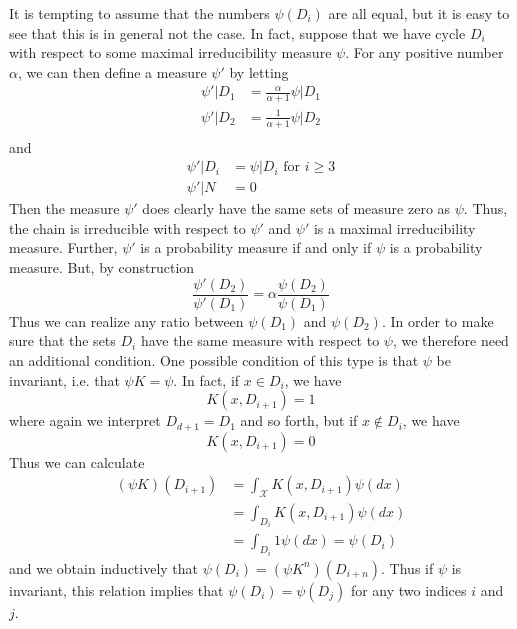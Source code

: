 \documentclass[a4paper, draft]{article}
\theoremstyle{own}
\theoremstyle{remark}
\begin{document}
It is tempting to assume that the numbers $\psi(D_i)$ are all equal, but it is easy to see that this is in general not the case. In fact, suppose that we have cycle $D_i$ with respect to some maximal irreducibility measure $\psi$. For any positive number $\alpha$, we can then define a measure
$\psi'$ by letting
\begin{align*}
\psi' | D_1 &= \frac{\alpha}{\alpha +1 } \psi | D_1 \\
\psi' | D_2 &= \frac{1}{\alpha +1 } \psi | D_2 \\
\end{align*}
and
\begin{align*}
\psi' | D_i &= \psi | D_i \, \, \text{for} \, \,  i \geq 3 \\
\psi' | N &= 0
\end{align*}
Then the measure $\psi'$ does clearly have the same sets of measure zero as $\psi$. Thus, the chain is irreducible with respect to $\psi'$ and $\psi'$ is a maximal irreducibility measure. Further, $\psi'$ is a probability measure if and only if $\psi$ is a probability measure. But, by construction
$$
\frac{\psi'(D_2)}{\psi'(D_1)} = \alpha \frac{\psi(D_2)}{\psi(D_1)}
$$
Thus we can realize any ratio between $\psi(D_1)$ and $\psi(D_2)$. In order to make sure that the sets $D_i$ have the same measure with respect to $\psi$, we therefore need an additional condition. One possible condition of this type is that $\psi$ be invariant, i.e. that $\psi K = \psi$. In fact, if 
$x \in D_i$, we have
$$
K(x, D_{i+1}) = 1
$$
where again we interpret $D_{d+1} = D_1$ and so forth, but if $x \notin D_i$, we have
$$
K(x,D_{i+1}) = 0
$$
Thus we can calculate
\begin{align*}
(\psi K)(D_{i+1}) &= \int_{\mathcal X} K(x,D_{i+1}) \psi(dx) \\
&= \int_{D_i} K(x,D_{i+1}) \psi(dx) \\
&= \int_{D_i} 1 \psi(dx) = \psi(D_i)
\end{align*}
and we obtain inductively that $\psi(D_i) = (\psi K^n)(D_{i+n})$. 
Thus if $\psi$ is invariant, this relation implies that $\psi(D_i) = \psi(D_j)$ for any two indices $i$ and $j$. 
\end{document}
